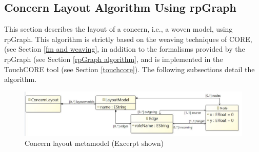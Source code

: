 \subsection{Concern Layout Algorithm Using rpGraph}
This section describes the layout of a concern, i.e., a woven model, using rpGraph. This algorithm is strictly based on the weaving techniques of CORE, (see Section \ref{fm and weaving}, in addition to the formalisms provided by the rpGraph (see Section \ref{rpGraph algorithm}, and is implemented in the TouchCORE tool (see Section \ref{touchcore}). The following subsections detail the algorithm.
\begin{figure}
	\centering
    \includegraphics[width=1\linewidth]{concernlayout.JPG}
    \caption{Concern layout metamodel (Excerpt shown)}
    \label{fig : concern layout metamodel}
\end{figure}
